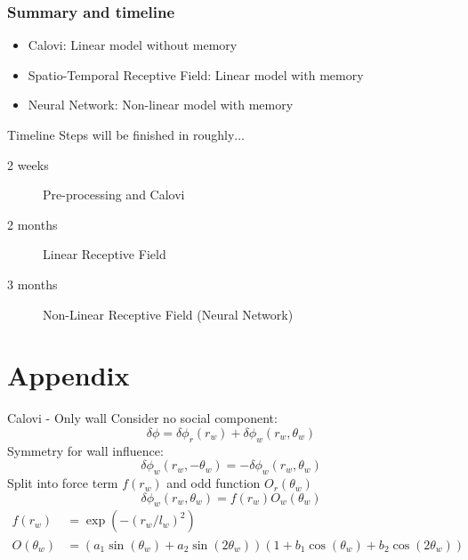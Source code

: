 \documentclass{beamer}
\begin{document}
\begin{frame}
  \frametitle{Summary and timeline}
  \begin{itemize}
  \item Calovi: Linear model without memory
  \item Spatio-Temporal Receptive Field: Linear model with memory
  \item Neural Network: Non-linear model with memory 
  \end{itemize}

  \begin{block}{Timeline}
    Steps will be finished in roughly$\dots$
  \begin{description}
\item[2 weeks] Pre-processing and Calovi
\item[2 months] Linear Receptive Field
\item[3 months] Non-Linear Receptive Field (Neural Network)
  \end{description}
   
  \end{block}
  
\end{frame}

\section{Appendix}

\begin{frame}{Calovi - Only wall}
Consider no social component:
 \begin{equation*}
  \label{eq:calovi-wall_model}
  \delta \phi = \delta \phi_r (r_w) + \delta \phi_w (r_w, \theta_w)
\end{equation*}
Symmetry for wall influence:
\begin{equation*}
  \label{eq:calovi-wall-symmetry}
   \delta \phi_w (r_w, -\theta_w) =  - \delta \phi_w (r_w, \theta_w)
\end{equation*}
Split into force term $f(r_w)$ and odd function $O_r(\theta_w)$ 
\begin{equation*}
  \label{eq:calovi-wall-split}
  \delta \phi_w (r_w, \theta_w) = f(r_w)O_w(\theta_w)
\end{equation*}
\begin{align*}
  \label{eq:calovi-wall-force}
  f(r_w) &= \exp\left( -{(r_w/l_w)}^2 \right) \\
  O(\theta_w) &= \left(a_1 \sin(\theta_w) + a_2 \sin(2  \theta_w)  \right)  \left(1 +  b_1  \cos(\theta_w) + b_2 \cos(2  \theta_w) \right)
\end{align*}
\end{frame}
\end{document}
